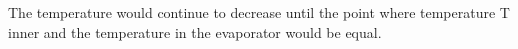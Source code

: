 The temperature would continue to decrease until the point where temperature T inner and the temperature in the evaporator would be equal.